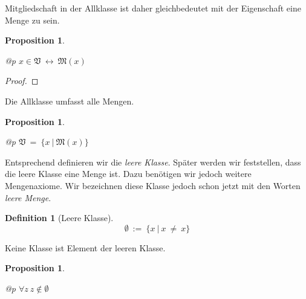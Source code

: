\documentclass[a4paper,german,10pt,twoside]{book}
\newtheorem{prop}[thm]{Proposition}
\theoremstyle{definition}
\newtheorem{defn}[thm]{Definition}
\theoremstyle{remark}
\begin{document}
\par
Mitgliedschaft in der Allklasse ist daher gleichbedeutet mit der 
Eigenschaft eine Menge zu sein.

\begin{prop}
\label{theorem:isInUniversalClass} \hypertarget{theorem:isInUniversalClass}{}
\mbox{}
\begin{longtable}{{@{\extracolsep{\fill}}p{\linewidth}}}
\centering $x \in \mathfrak{V}\ \leftrightarrow \ \mathfrak{M}(x)$
\end{longtable}

\end{prop}
\begin{proof}

\end{proof}




\par
Die Allklasse umfasst alle Mengen.

\begin{prop}
\label{theorem:universalClassContainsAllSets} \hypertarget{theorem:universalClassContainsAllSets}{}
\mbox{}
\begin{longtable}{{@{\extracolsep{\fill}}p{\linewidth}}}
\centering $\mathfrak{V} \ =  \ \{ x \ | \ \mathfrak{M}(x) \} $
\end{longtable}

\end{prop}




\par
Entsprechend definieren wir die \emph{leere Klasse}. Sp{\"a}ter werden wir feststellen, dass die leere Klasse
eine Menge ist. Dazu ben{\"o}tigen wir jedoch weitere Mengenaxiome. Wir bezeichnen diese Klasse jedoch
schon jetzt mit den Worten \emph{leere Menge}.

\begin{defn}[Leere Klasse]
\label{definition:emptySet} \hypertarget{definition:emptySet}{}
$$\emptyset\ := \ \{ x \ | \ x \ \neq \ x \} $$

\end{defn}




\par
Keine Klasse ist Element der leeren Klasse.

\begin{prop}
\label{theorem:noClassIsMemberOfEmptySet} \hypertarget{theorem:noClassIsMemberOfEmptySet}{}
\mbox{}
\begin{longtable}{{@{\extracolsep{\fill}}p{\linewidth}}}
\centering $\forall z\ z \notin \emptyset$
\end{longtable}

\end{prop}
\end{document}
